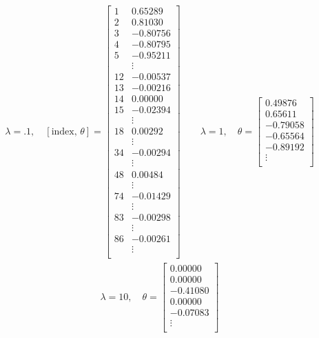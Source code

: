 \documentclass[11pt]{article}
\begin{document}
\begin{align*}
    \lambda = .1, \quad
    [\text{index, } \theta] =
    \begin{bmatrix}
        1   &   0.65289 \\
        2   &   0.81030 \\
        3   &  -0.80756 \\
        4   &  -0.80795 \\
        5   &  -0.95211 \\
            &   \vdots \\
        12  &  -0.00537 \\
        13  &  -0.00216 \\
        14  &   0.00000 \\
        15  &  -0.02394 \\
            &   \vdots \\
        18  &   0.00292 \\
            &   \vdots  \\
        34  &  -0.00294 \\
            &   \vdots  \\
        48  &   0.00484 \\
            &   \vdots \\
        74  &  -0.01429 \\
            &   \vdots \\
        83  &  -0.00298 \\
            &   \vdots \\
        86  &  -0.00261 \\
            &   \vdots \\
    \end{bmatrix}
    \quad\quad
    \lambda = 1, \quad
    \theta =
    \begin{bmatrix}
       0.49876 \\
       0.65611 \\
      -0.79058 \\
      -0.65564 \\
      -0.89192 \\
       \vdots  \\
    \end{bmatrix}
\end{align*}
\begin{align*}
    \lambda = 10, \quad
    \theta = 
    \begin{bmatrix}
       0.00000 \\
       0.00000 \\
      -0.41080 \\
       0.00000 \\
      -0.07083 \\
       \vdots  \\
    \end{bmatrix}
\end{align*}
\end{document}
